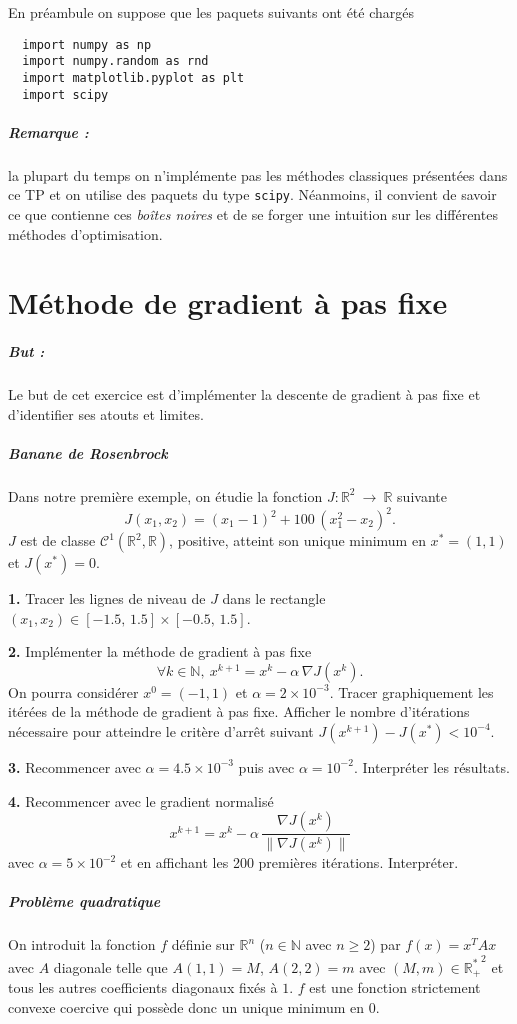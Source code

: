 \documentclass[a4paper,french,12pt]{article}
\begin{document}
En préambule on suppose que les paquets suivants ont été chargés
\begin{lstlisting}
  import numpy as np
  import numpy.random as rnd
  import matplotlib.pyplot as plt
  import scipy
\end{lstlisting}

\subparagraph{Remarque :} la plupart du temps on n'implémente pas les méthodes classiques présentées dans ce TP et on utilise des paquets du type \texttt{scipy}. Néanmoins, il convient de savoir ce que contienne ces \textit{boîtes noires} et de se forger une intuition sur les différentes méthodes d'optimisation.

\section{Méthode de gradient à pas fixe}
%
\subparagraph{But :} Le but de cet exercice est d'implémenter la descente de gradient à pas fixe et d'identifier ses
atouts et limites. 
\subparagraph{Banane de Rosenbrock}Dans notre première exemple, on étudie la fonction $J: \mathbb{R}^2 \ \rightarrow \ \mathbb{R}$ suivante
\[
J(x_1,x_2) = (x_1-1)^2 + 100\, (x_1^2-x_2)^2.
\]
$J$ est de classe $\mathcal{C}^1(\mathbb{R}^2, \mathbb{R})$, positive, atteint son unique minimum en $x^* = (1,1)$ et $J(x^*) = 0$.

\textbf{1.} Tracer les lignes de niveau de $J$ dans le rectangle 
$(x_1,x_2)\in [-1.5,\,1.5]\times[-0.5,\, 1.5]$.

\textbf{2.} Implémenter la méthode de gradient à pas fixe 
\[
\forall k \in \mathbb{N}, \ x^{k+1} = x^k - \alpha \, \nabla J(x^k).
\] 
On pourra considérer $x^0=(-1,1)$ et $\alpha=2\times 10^{-3}$.
Tracer graphiquement les itérées de la méthode de gradient à pas fixe.
Afficher le nombre d'itérations nécessaire pour atteindre le critère
d'arrêt suivant $J(x^{k+1})-J(x^*) < 10^{-4}$.

\textbf{3.} Recommencer avec $\alpha=4.5 \times 10^{-3}$ puis avec $\alpha=10^{-2}$. Interpréter les résultats.

\textbf{4.} Recommencer avec le gradient normalisé
\[
x^{k+1} = x^k - \alpha \, \frac{\nabla J(x^k)}{\|\nabla J(x^k)\|}
\]
avec $\alpha = 5 \times 10^{-2}$ et en affichant les 200 premières itérations. 
Interpréter.

\subparagraph{Problème quadratique}
On introduit la fonction $f$ définie sur $\mathbb{R}^n$ ($n \in \mathbb{N}$ avec $n \geq 2$) par $f(x) = x^T A x$ avec $A$ diagonale telle que $A(1,1) = M$, $A(2,2) = m$ avec $(M,m) \in {\mathbb{R}_+^*}^2$ et tous les autres coefficients diagonaux fixés à $1$. $f$ est une fonction strictement convexe coercive qui possède donc un unique minimum en $0$.
\end{document}
